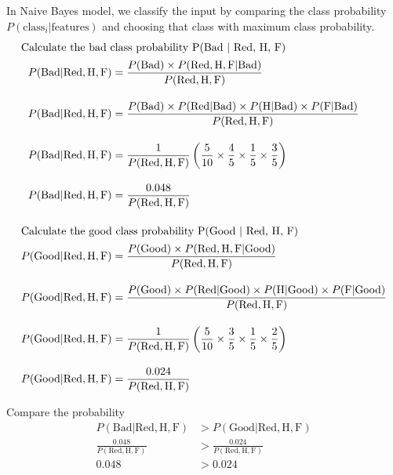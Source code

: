 \documentclass[12pt, a4paper]{article}
\begin{document}
            In Naive Bayes model, we classify the input by comparing the class probability $P({\text{class}}_{i} | \text{features})$ and choosing that class with maximum class probability.
            \begin{align*}
                \intertext{Calculate the bad class probability P(\text{Bad} | \text{Red}, \text{H}, \text{F})}
                P(\text{Bad} | \text{Red}, \text{H}, \text{F}) &= \frac{P(\text{Bad}) \times P(\text{Red}, \text{H}, \text{F} | \text{Bad})}{P(\text{Red}, \text{H}, \text{F})} \\[1em]
                P(\text{Bad} | \text{Red}, \text{H}, \text{F}) &= \frac{P(\text{Bad}) \times P(\text{Red} | \text{Bad}) \times P(\text{H} | \text{Bad}) \times P(\text{F} | \text{Bad})}{P(\text{Red}, \text{H}, \text{F})} \\[1em]
                P(\text{Bad} | \text{Red}, \text{H}, \text{F}) &= \frac{1}{P(\text{Red}, \text{H}, \text{F})} \left( \frac{5}{10} \times \frac{4}{5} \times \frac{1}{5} \times \frac{3}{5} \right) \\[1em]
                P(\text{Bad} | \text{Red}, \text{H}, \text{F}) &= \frac{0.048}{P(\text{Red}, \text{H}, \text{F})} \\[1em]
                \intertext{Calculate the good class probability P(\text{Good} | \text{Red}, \text{H}, \text{F})}
                P(\text{Good} | \text{Red}, \text{H}, \text{F}) &= \frac{P(\text{Good}) \times P(\text{Red}, \text{H}, \text{F} | \text{Good})}{P(\text{Red}, \text{H}, \text{F})} \\[1em]
                P(\text{Good} | \text{Red}, \text{H}, \text{F}) &= \frac{P(\text{Good}) \times P(\text{Red} | \text{Good}) \times P(\text{H} | \text{Good}) \times P(\text{F} | \text{Good})}{P(\text{Red}, \text{H}, \text{F})} \\[1em]
                P(\text{Good} | \text{Red}, \text{H}, \text{F}) &= \frac{1}{P(\text{Red}, \text{H}, \text{F})} \left( \frac{5}{10} \times \frac{3}{5} \times \frac{1}{5} \times \frac{2}{5} \right) \\[1em]
                P(\text{Good} | \text{Red}, \text{H}, \text{F}) &= \frac{0.024}{P(\text{Red}, \text{H}, \text{F})}
            \end{align*}

            \noindent Compare the probability
            \begin{align*}
                P(\text{Bad} | \text{Red}, \text{H}, \text{F}) &> P(\text{Good} | \text{Red}, \text{H}, \text{F}) \\
                \frac{0.048}{P(\text{Red}, \text{H}, \text{F})} &> \frac{0.024}{P(\text{Red}, \text{H}, \text{F})} \\
                0.048 &> 0.024
            \end{align*}
\end{document}
